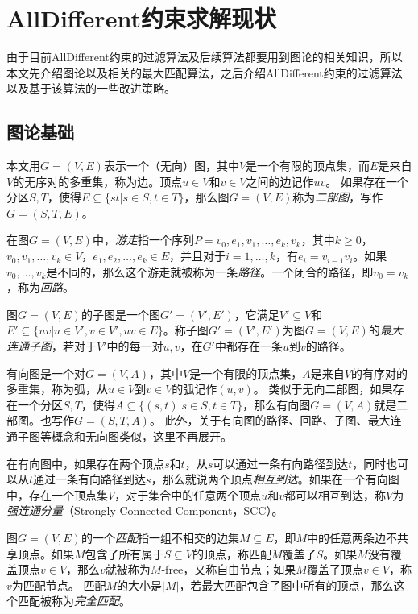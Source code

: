 \section{AllDifferent约束求解现状}

由于目前AllDifferent约束的过滤算法及后续算法都要用到图论的相关知识，所以本文先介绍图论以及相关的最大匹配算法，之后介绍AllDifferent约束的过滤算法以及基于该算法的一些改进策略。

\subsection{图论基础}

本文用$G = (V, E)$表示一个（无向）图，其中$V$是一个有限的顶点集，而$E$是来自$V$的无序对的多重集，称为边。顶点$u \in V$和$v \in V$之间的边记作$uv$。
如果存在一个分区$S, T$，使得$E \subseteq \{st | s \in S, t \in T \}$，那么图$G = (V, E)$称为\textit{二部图}，写作$G = (S, T, E)$。

在图$G = (V, E)$中，\textit{游走}指一个序列$P = v_0, e_1, v_1, \dots, e_k, v_k$，其中$k \geq 0$，$v_0, v_1, \dots, v_k \in V$，$e_1, e_2, \dots, e_k \in E$，并且对于$i = 1, \dots, k$，有$e_i = v_{i-1}v_i$。如果$v_0, \dots, v_k$是不同的，那么这个游走就被称为一条\textit{路径}。一个闭合的路径，即$v_0 = v_k$，称为\textit{回路}。

图$G = (V, E)$的子图是一个图$G' = (V', E')$，它满足$V' \subseteq V$和$E' \subseteq \{uv | u \in V', v \in V', uv \in E\}$。称子图$G' = (V', E')$为图$G = (V, E)$的\textit{最大连通子图}，若对于$V'$中的每一对$u, v$，在$G'$中都存在一条$u$到$v$的路径。

有向图是一个对$G = (V, A)$，其中$V$是一个有限的顶点集，$A$是来自$V$的有序对的多重集，称为弧，从$u \in V$到$v \in V$的弧记作$(u, v)$。
类似于无向二部图，如果存在一个分区$S, T$，使得$A \subseteq \{(s, t) | s \in S, t \in T \}$，那么有向图$G = (V, A)$就是二部图。也写作$G = (S, T, A)$。
此外，关于有向图的路径、回路、子图、最大连通子图等概念和无向图类似，这里不再展开。

在有向图中，如果存在两个顶点$s$和$t$，从$s$可以通过一条有向路径到达$t$，同时也可以从$t$通过一条有向路径到达$s$，那么就说两个顶点\textit{相互到达}。如果在一个有向图中，存在一个顶点集$V$，对于集合中的任意两个顶点$u$和$v$都可以相互到达，称$V$为\textit{强连通分量}（Strongly Connected Component，SCC）。

图$G = (V, E)$的一个\textit{匹配}指一组不相交的边集$M \subseteq E$，即$M$中的任意两条边不共享顶点。如果$M$包含了所有属于$S \subseteq V$的顶点，称匹配$M$覆盖了$S$。如果$M$没有覆盖顶点$v \in V$，那么$v$就被称为$M$-free，又称自由节点；如果$M$覆盖了顶点$v \in V$，称$v$为匹配节点。
匹配$M$的大小是$|M|$，若最大匹配包含了图中所有的顶点，那么这个匹配被称为\textit{完全匹配}。

